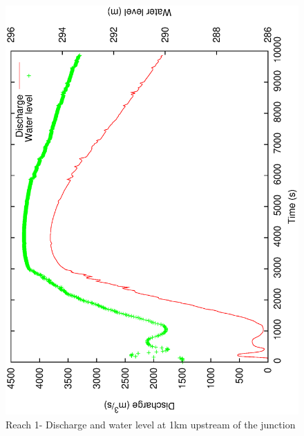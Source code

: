 \documentclass[a4paper,12pt]{article}
\begin{document}
\begin{figure}[!b]
  \begin{center}
  \includegraphics[scale=0.42,angle=-90]{junction_R1}
  \caption{Reach 1- Discharge and water level at 1km upstream of the junction}
  \label{fig:Discharge-and-water_R1}
  \end{center}
\end{figure}

\newpage
\end{document}
